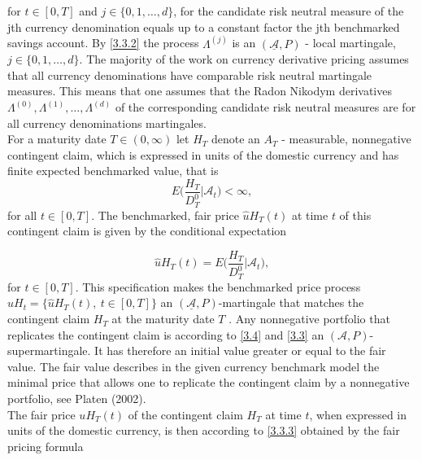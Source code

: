 \documentclass[a4 paper, 12pt]{report}
\theoremstyle{plain}
\begin{document}
for $t \in [0, T]$ and $j \in \{0, 1,\ldots, d\}$, for the candidate risk neutral measure of the
jth currency denomination equals up to a constant factor the jth benchmarked savings account. By \eqref{3.3.2} the process $\Lambda^{(j)}$ is an $(\mathcal{\underline{A}}, P)$ - local martingale, $j \in \{0, 1,\ldots,d\}$. The majority of the work on currency derivative pricing assumes that all currency denominations have comparable risk neutral martingale measures. %
This means that one assumes that the Radon Nikodym derivatives $\Lambda^{(0)}, \Lambda^{(1)},\ldots,\Lambda^{(d)}$ of the corresponding candidate risk neutral
measures are for all currency denominations martingales.\\
For a maturity date $T \in (0,\infty)$ let $H_T$ denote an
$A_T$ - measurable, nonnegative contingent claim, which is expressed in units of
the domestic currency and has finite expected benchmarked value, that is
\begin{equation}\label{3.3.6}
E\bigg(\frac{H_T}{D_T^0}\bigg|\mathcal{A}_t\bigg)<\infty,
\end{equation}
for all $t\in[0,T]$. The benchmarked, fair price $\hat{u}H_T(t)$ at time $t$ of this contingent claim is given by the conditional expectation

\begin{equation}\label{3.3.7}
\hat{u}H_T(t) = E\bigg(\frac{H_T}{D_T^0}\bigg|\mathcal{A}_t\bigg),
\end{equation}
for $t \in [0, T].$ This specification makes the benchmarked price process $\hat{u}H_t = \{\hat{u}H_T(t),~t\in[0,T]\}$  an $(\mathcal{\underline{A}}, P)$-martingale that matches the contingent claim $H_T$ at
the maturity date $T$ . Any nonnegative portfolio that replicates the contingent
claim is according to \eqref{3.4} and \eqref{3.3} an $(\mathcal{A}, P)$-supermartingale. It has therefore
an initial value greater or equal to the fair value. The fair value describes in the
given currency benchmark model the minimal price that allows one to replicate
the contingent claim by a nonnegative portfolio, see Platen (2002).\\
The fair price $uH_T(t)$ of the contingent claim $H_T$ at time $t$, when expressed in units of the domestic currency, is then according to \eqref{3.3.3} obtained by the fair
pricing formula
\end{document}
